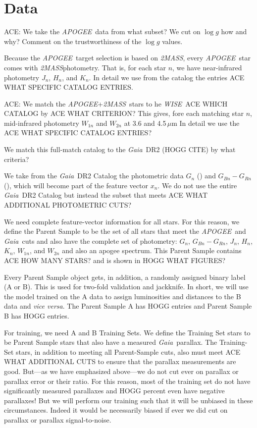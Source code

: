\documentclass[modern]{aastex62}
\newcommand{\code}[1]{\texttt{\detokenize{#1}}}
\newcommand{\foreign}[1]{\textsl{#1}}
\newcommand{\acronym}[1]{{\small{#1}}}
\newcommand{\project}[1]{\textsl{#1}}
\newcommand{\apogee}{\project{\acronym{APOGEE}}}
\newcommand{\gaia}{\project{Gaia}}
\newcommand{\wise}{\project{\acronym{WISE}}}
\newcommand{\zmass}{\project{\acronym{2MASS}}}
\newcommand{\logg}{\log g}
\begin{document}
\section{Data}

ACE: We take the \apogee\ data from what subset?
We cut on $\logg$ how and why? Comment on the trustworthiness of the $\logg$ values.

Because the \apogee\ target selection is based on \zmass, every \apogee\ star
comes with \zmass photometry.
That is, for each star $n$,
we have near-infrared photometry $J_n$, $H_n$, and $K_n$.
In detail we use from the catalog the entries ACE WHAT SPECIFIC CATALOG ENTRIES.

ACE: We match the \apogee+\zmass\ stars to he \wise\ ACE WHICH CATALOG by ACE WHAT CRITERION?
This gives, fore each matching star $n$,
mid-infrared photometry $W_{1n}$ and $W_{2n}$ at 3.6 and 4.5\,$\mu$m
In detail we use the ACE WHAT SPECIFIC CATALOG ENTRIES?

We match this full-match catalog to the \gaia\ \acronym{DR2} (HOGG CITE) by what criteria?

We take from the \gaia\ \acronym{DR2} Catalog the photometric data $G_n$
(\code{phot_g_mean_mag}) and $G_{Bn}-G_{Rn}$ (\code{bp_rp}), which will
become part of the feature vector $x_n$.
We do not use the entire \gaia\ \acronym{DR2} Catalog but instead the subset
that meets ACE WHAT ADDITIONAL PHOTOMETRIC CUTS?

We need complete feature-vector information for all stars.  For this
reason, we define the Parent Sample to be the set of all stars that
meet the \apogee\ and \gaia\ cuts and also
have the complete set of photometry: $G_n$, $G_{Bn}-G_{Rn}$, $J_n$,
$H_n$, $K_n$, $W_{1n}$, and $W_{2n}$ and also an apogee spectrum.
This Parent Sample contains ACE HOW MANY STARS? and is shown in HOGG WHAT FIGURES?

Every Parent Sample object gets, in addition, a randomly assigned binary
label (A or B).
This is used for two-fold validation and jackknife.
In short, we will use the model trained on the A data to assign luminosities
and distances to the B data and \foreign{vice versa}.
The Parent Sample A has HOGG entries and Parent Sample B has HOGG entries.

For training, we need A and B Training Sets.
We define the Training Set stars to be Parent Sample stars that also
have a measured \gaia\ parallax.
The Training-Set stars, in addition to meeting all Parent-Sample cuts,
also must meet ACE WHAT ADDITIONAL CUTS to ensure that the parallax
measurements are good.
But---as we have emphasized above---we do not cut ever on parallax or
parallax error or their ratio. For this reason, most of the training set
do not have significantly measured parallaxes and HOGG percent even have
negative parallaxes!
But we will perform our training such that it will be unbiased in these
circumstances.
Indeed it would be necessarily biased if ever we did cut on parallax or
parallax signal-to-noise.
\end{document}
